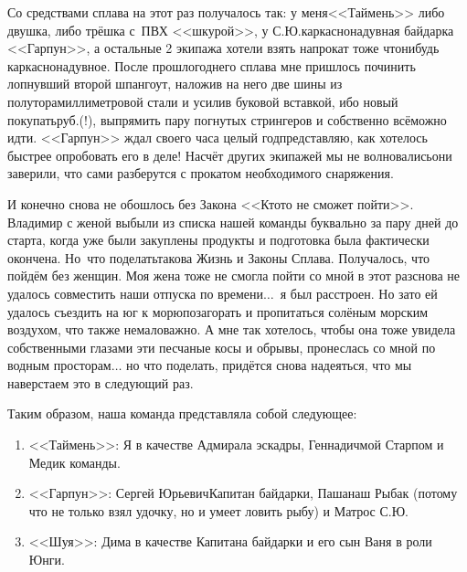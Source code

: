 Со средствами сплава на этот раз получалось так: у меня\mdash <<Таймень>> либо двушка, либо трёшка с~ПВХ <<шкурой>>, у С.Ю.\mdash каркасно\sdash надувная байдарка <<Гарпун>>, а остальные 2 экипажа хотели взять напрокат тоже что\sdash нибудь каркасно\sdash надувное. После прошлогоднего сплава мне пришлось починить лопнувший второй шпангоут, наложив на него две шины из полуторамиллиметровой стали и усилив буковой вставкой, ибо новый покупать\thinspace руб.(!), выпрямить пару погнутых стрингеров и собственно всё\mdash можно идти. <<Гарпун>> ждал своего часа целый год\mdash представляю, как хотелось быстрее опробовать его в деле! Насчёт других экипажей мы не волновались\mdash они заверили, что сами разберутся с прокатом необходимого снаряжения. 

И конечно снова не обошлось без Закона <<Кто\sdash то не сможет пойти>>. Владимир с женой выбыли из списка нашей команды буквально за пару дней до старта, когда уже были закуплены продукты и подготовка была фактически окончена. Но~что поделать\mdash такова Жизнь и Законы Сплава. Получалось, что пойдём без женщин. Моя жена тоже не смогла пойти со мной в этот раз\mdash снова не удалось совместить наши отпуска по времени$\ldots$~я был расстроен. Но зато ей удалось съездить на юг к морю\mdash позагорать и пропитаться солёным морским воздухом, что также немаловажно. А мне так хотелось, чтобы она тоже увидела собственными глазами эти песчаные косы и обрывы, пронеслась со мной по водным просторам$\ldots$ но что поделать, придётся снова надеяться, что мы наверстаем это в следующий раз. 

Таким образом, наша команда представляла собой следующее:
\begin{enumerate}
	\item <<Таймень>>: Я в качестве Адмирала эскадры, Геннадич\mdash мой Старпом и Медик команды.
	\item <<Гарпун>>: Сергей Юрьевич\mdash  Капитан байдарки, Паша\mdash наш Рыбак (потому что не только взял удочку, но и умеет ловить рыбу) и Матрос С.Ю.
	\item <<Шуя>>: Дима в качестве Капитана байдарки и его сын Ваня в роли Юнги.
\end{enumerate}


\begin{center}
\end{center}
